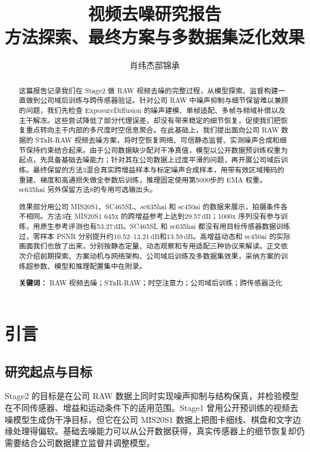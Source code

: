 \documentclass[11pt,a4paper,UTF8,fontset=fandol]{ctexart}
\title{\textbf{视频去噪研究报告}\\[0.4em]
\large 方法探索、最终方案与多数据集泛化效果}
\author{肖纬杰\quad 邸锦承}
\date{}
\newcommand{\db}{\ensuremath{\,\mathrm{dB}}}
\begin{document}
\maketitle
\begin{abstract}
\noindent
这篇报告记录我们在 Stage2 做 RAW 视频去噪的完整过程，从模型探索、监督构建一直做到公司域后训练与跨传感器验证。针对公司 RAW 中噪声抑制与细节保留难以兼顾的问题，我们先检查 ExposureDiffusion 的噪声建模、单帧适配、多帧与频域补偿以及主干解冻。这些尝试降低了部分代理误差，却没有带来稳定的细节恢复，促使我们把恢复重点转向主干内部的多尺度时空信息聚合。在此基础上，我们提出面向公司 RAW 数据的 STaR-RAW 视频去噪方案，将时空恢复网络、可信静态监督、实测噪声合成和细节保持约束结合起来。由于公司数据缺少配对干净真值，模型以公开数据预训练权重为起点，先具备基础去噪能力；针对其在公司数据上过度平滑的问题，再开展公司域后训练。最终保留的方法3混合真实跨增益样本与标定噪声合成样本，用带有效区域掩码的重建、梯度和高通损失做全参数后训练，推理固定使用第5000步的 EMA 权重。sc635hai 另外保留方法8的专用可选输出头。

效果部分用公司 MIS20S1、SC465SL、sc635hai 和 sc450ai 的数据来展示，拍摄条件各不相同。方法3在 MIS20S1 645x 的跨增益参考上达到29.57\db；1000x 序列没有参与训练，用原生参考评测也有53.27\db。SC465SL 和 sc635hai 都没有用目标传感器数据训练过，零样本 PSNR 分别提升约10.52--13.21\db 和13.59\db。高增益动态和 sc450ai 的实际画面我们也放了出来，分别按静态定量、动态观察和专用适配三种协议来解读。正文依次介绍前期探索、方案动机与网络架构、公司域后训练及多数据集效果，采纳方案的训练超参数、模型和推理配置集中在附录。

\vspace{0.6em}
\noindent\textbf{关键词：} RAW 视频去噪；STaR-RAW；时空注意力；公司域后训练；跨传感器泛化
\end{abstract}

\newpage
{\footnotesize\setlength{\parskip}{0pt}\setlength{\baselineskip}{11pt}\tableofcontents}
\newpage

\section{引言}

\subsection{研究起点与目标}

Stage2 的目标是在公司 RAW 数据上同时实现噪声抑制与结构保真，并检验模型在不同传感器、增益和运动条件下的适用范围。Stage1 曾用公开预训练的视频去噪模型生成伪干净目标，但它在公司 MIS20S1 数据上把图卡细线、棋盘和文字边缘处理得偏软。基础去噪能力可以从公开数据获得，真实传感器上的细节恢复却仍需要结合公司数据建立监督并调整模型。
\end{document}

